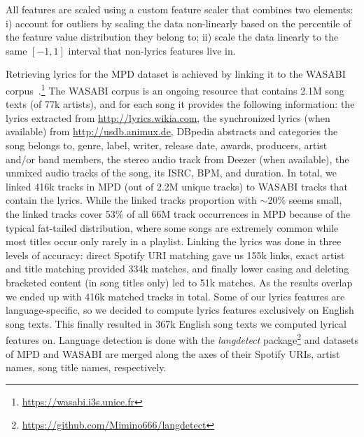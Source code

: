All features are scaled using a custom feature scaler that combines two elements: i) account for outliers by scaling the data non-linearly based on the percentile of the feature value distribution they belong to; ii) scale the data linearly to the same $[-1,1]$ interval that non-lyrics features live in.

Retrieving lyrics for the MPD dataset is achieved by linking it to the WASABI corpus~\cite{meseguerbrocal:hal-01589250}.\footnote{\url{https://wasabi.i3s.unice.fr}} The WASABI corpus is an ongoing resource that contains 2.1M song texts (of 77k artists), and for each song it provides the following information: the lyrics extracted from \url{http://lyrics.wikia.com}, the synchronized lyrics (when available) from \url{http://usdb.animux.de}, DBpedia abstracts and categories the song belongs to, genre, label, writer, release date, awards, producers, artist and/or band members, the stereo audio track from Deezer (when available), the unmixed audio tracks of the song, its ISRC, BPM, and duration. In total, we linked 416k tracks in MPD (out of 2.2M unique tracks) to WASABI tracks that contain the lyrics. While the linked tracks proportion with $\sim$20\% seems small, the linked tracks cover 53\% of all 66M track occurrences in MPD because of the typical fat-tailed distribution, where some songs are extremely common while most titles occur only rarely in a playlist. Linking the lyrics was done in three levels of accuracy: direct Spotify URI matching gave us 155k links, exact artist and title matching provided 334k matches, and finally lower casing and deleting bracketed content (in song titles only) led to 51k matches. As the results overlap we ended up with 416k matched tracks in total. Some of our lyrics features are language-specific, so we decided to compute lyrics features exclusively on English song texts. This finally resulted in 367k English song texts we computed lyrical features on. Language detection is done with the \textit{langdetect} package\footnote{\url{https://github.com/Mimino666/langdetect}} and datasets of MPD and WASABI are merged along the axes of their Spotify URIs, artist names, song title names, respectively.

